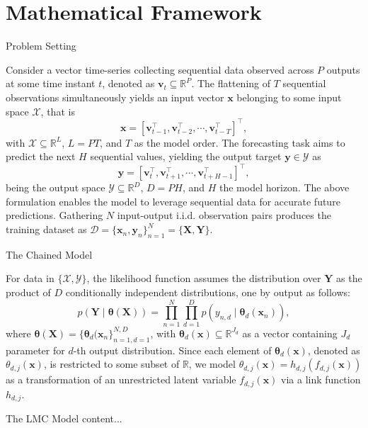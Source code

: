 \section{Mathematical Framework}

\begin{frame}{Problem Setting}

Consider a vector time-series collecting sequential data observed across $P$ outputs at some time instant \( t \), denoted as \( \boldsymbol{v}_t \subseteq \mathbb{R}^{P}\). The flattening of \( T \) sequential observations simultaneously yields an input vector \( \boldsymbol{x} \) belonging to some input space \( \mathcal{X} \), that is
\[
\boldsymbol{x}= [ \boldsymbol{v}_{t-1}^\top, \boldsymbol{v}_{t-2}^\top, \cdots, \boldsymbol{v}_{t-T}^\top  ]^\top,
\]
with \( {\mathcal{X}} \subseteq \mathbb{R}^{L} \), \( L = PT \), and \( T \) as the model order. The forecasting task aims to predict the next \(H\) sequential values, yielding the output target \( \boldsymbol{y} \in {\mathcal{Y}} \) as
\[
\boldsymbol{y} = [ \boldsymbol{v}_{t}^\top, \boldsymbol{v}_{t+1}^\top, \cdots, \boldsymbol{v}_{t+H-1}^\top  ]^\top,
\] 
being the output space \( {\mathcal{Y}} \subseteq \mathbb{R}^{D} \), \( D = PH \), and \( H \) the model horizon. The above formulation enables the model to leverage sequential data for accurate future predictions. Gathering \( N \) input-output i.i.d. observation pairs produces the training dataset as \( {\mathcal{D}} = \{\boldsymbol{x}_n, \boldsymbol{y}_n\}_{n=1}^N = \{ \boldsymbol{X}, \boldsymbol{Y}\} \).

\end{frame}

\begin{frame}{The Chained Model}

For data in $\{\mathcal{X},\mathcal{Y}\}$, the likelihood function assumes the distribution over \(  \boldsymbol{Y} \) as the product of \( D \) conditionally independent distributions, one by output as follows:
\begin{equation}\label{eq:likelihood_funciton}
	p(\boldsymbol{Y} \mid \boldsymbol{\theta}(\boldsymbol{X})) = \prod_{n=1}^N \prod_{d=1}^D p\left(y_{n,d} \mid \boldsymbol{\theta}_d(\boldsymbol{x}_n)\right),
\end{equation}
where \( \boldsymbol{\theta}(\boldsymbol{X}) = \{ \boldsymbol{\theta}_d(\boldsymbol{x}_n \}_{n=1,d=1}^{N, D} \), with \( \boldsymbol{\theta}_d(\boldsymbol{x}) \subseteq \mathbb{R}^{J_d} \) as a vector containing \( J_d \) parameter for \( d \)-th output distribution. Since each element of \( \boldsymbol{\theta}_d(\boldsymbol{x}) \), denoted as \( \theta_{d,j}(\boldsymbol{x}) \), is restricted to some subset of \( \mathbb{R} \), we model \( \theta_{d,j}(\boldsymbol{x}) = h_{d,j}(f_{d,j}(\boldsymbol{x})) \) as a transformation of an unrestricted latent variable \( f_{d,j}(\boldsymbol{x}) \) via a link function \( h_{d,j} \).

\end{frame}

\begin{frame}{The LMC Model}
	content...
\end{frame}